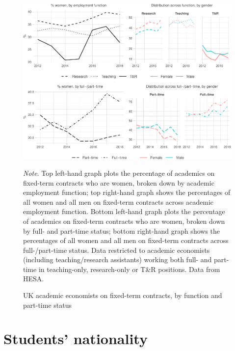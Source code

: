 \documentclass[a4paper, 1]{article}
\begin{document}
\begin{figure}[h!]
\centering
\includegraphics[width=\linewidth]{0-images/fixed-term-2-1.pdf}

\caption{UK academic economists on fixed-term contracts, by function and part-time status}
\label{fig:fixed-term-2}
\justify\footnotesize\textit{Note}.  Top left-hand graph plots the percentage of academics on fixed-term contracts who are women, broken down by academic employment function; top right-hand graph shows the percentages of all women and all men on fixed-term contracts across academic employment function. Bottom left-hand graph plots the percentage of academics on fixed-term contracts who are women, broken down by full- and part-time status; bottom right-hand graph shows the percentages of all women and all men on fixed-term contracts across full-/part-time status. Data restricted to academic economists (including teaching/research assistants) working both full- and part-time in teaching-only, research-only or T\&R positions. Data from HESA.
\end{figure}



\newpage

\hypertarget{sec:student-nationality}{%
\section{Students' nationality}\label{sec:student-nationality}}
\end{document}

